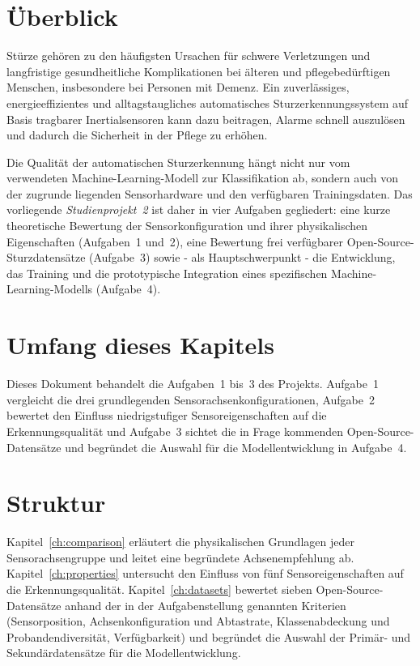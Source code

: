 \documentclass[11pt,a4paper,oneside]{report}
\begin{document}
\section{Überblick}
Stürze gehören zu den häufigsten Ursachen für schwere Verletzungen und
langfristige gesundheitliche Komplikationen bei älteren und pflegebedürftigen
Menschen, insbesondere bei Personen mit Demenz. Ein zuverlässiges,
energieeffizientes und alltagstaugliches automatisches Sturzerkennungssystem
auf Basis tragbarer Inertialsensoren kann dazu beitragen, Alarme schnell
auszulösen und dadurch die Sicherheit in der Pflege zu erhöhen.

Die Qualität der automatischen Sturzerkennung hängt nicht nur vom verwendeten
Machine-Learning-Modell zur Klassifikation ab, sondern auch von der zugrunde
liegenden Sensorhardware und den verfügbaren Trainingsdaten. Das vorliegende
\emph{Studienprojekt~2} ist daher in vier Aufgaben gegliedert: eine kurze
theoretische Bewertung der Sensorkonfiguration und ihrer physikalischen
Eigenschaften (Aufgaben~1 und~2), eine Bewertung frei verfügbarer
Open-Source-Sturzdatensätze (Aufgabe~3) sowie - als Hauptschwerpunkt - die
Entwicklung, das Training und die prototypische Integration eines spezifischen
Machine-Learning-Modells (Aufgabe~4).

\section{Umfang dieses Kapitels}
Dieses Dokument behandelt die Aufgaben~1 bis~3 des Projekts. Aufgabe~1
vergleicht die drei grundlegenden Sensorachsenkonfigurationen, Aufgabe~2
bewertet den Einfluss niedrigstufiger Sensoreigenschaften auf die
Erkennungsqualität und Aufgabe~3 sichtet die in Frage kommenden
Open-Source-Datensätze und begründet die Auswahl für die
Modellentwicklung in Aufgabe~4.

\section{Struktur}
Kapitel~\ref{ch:comparison} erläutert die physikalischen Grundlagen jeder
Sensorachsengruppe und leitet eine begründete Achsenempfehlung ab.
Kapitel~\ref{ch:properties} untersucht den Einfluss von fünf
Sensoreigenschaften auf die Erkennungsqualität.
Kapitel~\ref{ch:datasets} bewertet sieben Open-Source-Datensätze anhand
der in der Aufgabenstellung genannten Kriterien (Sensorposition,
Achsenkonfiguration und Abtastrate, Klassenabdeckung und Probanden\-diversität,
Verfügbarkeit) und begründet die Auswahl der Primär- und
Sekundärdatensätze für die Modellentwicklung.
\end{document}
